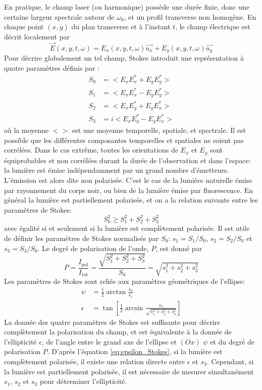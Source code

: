 En pratique, le champ laser (ou harmonique) possède une durée finie, donc une certaine largeur spectrale autour de $\omega_0$, et un profil transverse non homogène. En chaque point $(x,y)$ du plan transverse et à l'instant $t$, le champ électrique est décrit localement par
\begin{equation}
\vec{E}(x,y,t,\omega) = E_x(x,y,t,\omega) \vec{u_x} + E_y(x,y,t,\omega) \vec{u_y}
\end{equation}
Pour décrire globalement un tel champ, Stokes introduit une représentation à quatre paramètres définis par :
\begin{align}
S_0 & = <E_x E_x^* + E_y E_y^*> \\
S_1 & = <E_x E_x^* - E_y E_y^*> \\
S_2 & = <E_x E_y^* + E_y E_x^*>\\
S_3 & = i <E_x E_y^* - E_y E_x^*>
\end{align}
où la moyenne $< >$ est une moyenne temporelle, spatiale, et spectrale.
Il est possible que les différentes composantes temporelles et spatiales ne soient pas corrélées. Dans le cas extrême, toutes les orientations de $E_x$ et $E_y$ sont équiprobables et non corrélées durant la durée de l'observation et dans l'espace: la lumière est émise indépendamment par un grand nombre d'émetteurs. L'émission est alors dite non polarisée. C'est le cas de la lumière naturelle émise par rayonnement du corps noir, ou bien de la lumière émise par fluorescence. En général la lumière est partiellement polarisée, et on a la relation suivante entre les paramètres de Stokes:
\begin{equation}
S_0^2 \geqslant S_1^2 + S_2^2 + S_3^2
\end{equation}
avec égalité si et seulement si la lumière est complètement polarisée. Il est utile de définir les paramètres de Stokes normalisés par $S_0$: $s_1 = S_1 /S_0$, $s_2 = S_2 /S_0$ et $s_3 = S_3 /S_0$.
Le degré de polarisation de l'onde, $P$, est donné par 
\begin{equation}
P = \frac{I_{\text{pol}}}{I_{\text{tot}}} = \frac{\sqrt{S_1^2 + S_2^2 + S_3^2}}{S_0} = \sqrt{s_1^2 + s_2^2 + s_3^2}
\label{eq:degrépolarisation}
\end{equation}
Les paramètres de Stokes sont reliés aux paramètres géométriques de l'ellipse:
\begin{align}
\psi & = \frac{1}{2} \arctan \frac{s_2}{s_1} \label{eq:PsiStokes} \\
\epsilon & = \tan \left[ \frac{1}{2} \arcsin \frac{s_3}{\sqrt{s_1^2 + s_2^2 + s_3^2}} \right]
\label{eq:epsilon_Stokes}
\end{align}
La donnée des quatre paramètres de Stokes est suffisante pour décrire complètement la polarisation du champ, et est équivalente à la donnée de l'ellipticité $\epsilon$, de l'angle entre le grand axe de l'ellipse et $(Ox)$ $\psi$ et du degré de polarisation $P$. D'après l'équation \ref{eq:epsilon_Stokes}, si la lumière est complètement polarisée, il existe une relation directe entre $\epsilon$ et $s_3$. Cependant, si la lumière est partiellement polarisée, il est nécessaire de mesurer simultanément $s_1$, $s_2$ et $s_3$ pour déterminer l'ellipticité.

